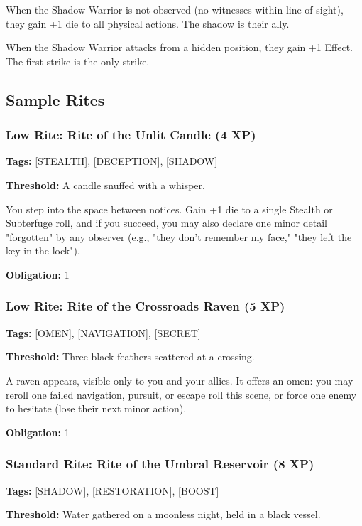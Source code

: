 When the Shadow Warrior is not observed (no witnesses within line of sight), they gain +1 die to all physical actions. The shadow is their ally.

When the Shadow Warrior attacks from a hidden position, they gain +1 Effect. The first strike is the only strike.

\subsection{Sample Rites}

\subsubsection{Low Rite: Rite of the Unlit Candle (4 XP)}

\textbf{Tags:} [STEALTH], [DECEPTION], [SHADOW]

\textbf{Threshold:} A candle snuffed with a whisper.

You step into the space between notices. Gain +1 die to a single Stealth or Subterfuge roll, and if you succeed, you may also declare one minor detail "forgotten" by any observer (e.g., "they don't remember my face," "they left the key in the lock").

\textbf{Obligation:} 1

\subsubsection{Low Rite: Rite of the Crossroads Raven (5 XP)}

\textbf{Tags:} [OMEN], [NAVIGATION], [SECRET]

\textbf{Threshold:} Three black feathers scattered at a crossing.

A raven appears, visible only to you and your allies. It offers an omen: you may reroll one failed navigation, pursuit, or escape roll this scene, or force one enemy to hesitate (lose their next minor action).

\textbf{Obligation:} 1

\subsubsection{Standard Rite: Rite of the Umbral Reservoir (8 XP)}

\textbf{Tags:} [SHADOW], [RESTORATION], [BOOST]

\textbf{Threshold:} Water gathered on a moonless night, held in a black vessel.


